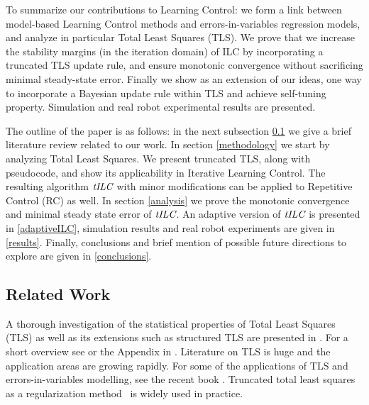 To summarize our contributions to Learning Control: we form a link between model-based Learning Control methods and errors-in-variables regression models, and analyze in particular Total Least Squares (TLS). We prove that we increase the stability margins (in the iteration domain) of ILC by incorporating a truncated TLS update rule, and ensure monotonic convergence without sacrificing minimal steady-state error. 
Finally we show as an extension of our ideas, one way to incorporate a Bayesian update rule within TLS and achieve self-tuning property. Simulation and real robot experimental results are presented.

The outline of the paper is as follows: in the next subsection \ref{relatedWork} we give a brief literature review related to our work. In section \ref{methodology} we start by analyzing Total Least Squares. We present truncated TLS, along with pseudocode, and show its applicability in Iterative Learning Control. The resulting algorithm $\emph{tILC}$ with minor modifications can be applied to Repetitive Control (RC) as well. In section \ref{analysis} we prove the monotonic convergence and minimal steady state error of $\emph{tILC}$. An adaptive version of $\emph{tILC}$ is presented in \ref{adaptiveILC}, simulation results and real robot experiments are given in \ref{results}. Finally, conclusions and brief mention of possible future directions to explore are given in \ref{conclusions}.

\subsection{Related Work}\label{relatedWork}

A thorough investigation of the statistical properties of Total Least Squares (TLS) as well as its extensions such as structured TLS are presented in \cite{VanHuffel91}. For a short overview see \cite{Golub80} or the Appendix in \cite{Golub96}. Literature on TLS is huge and the application areas are growing rapidly. For some of the applications of TLS and errors-in-variables modelling, see the recent book \cite{VanHuffel13}. Truncated total least squares as a regularization method~\cite{Fierro97} is widely used in practice. %

